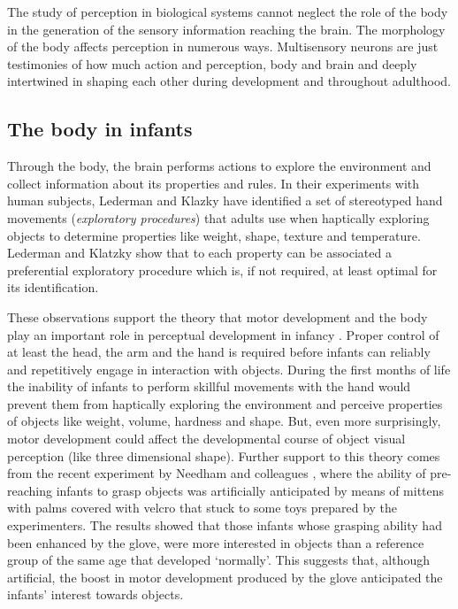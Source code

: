 The study of perception in biological systems cannot neglect the role
of the body in the generation of the sensory information reaching the
brain.  The morphology of the body affects perception in numerous
ways. Multisensory neurons are just testimonies of how much action 
and perception, body and brain and deeply intertwined in shaping each
other during development and throughout adulthood.


\subsection{The body in infants}

Through the body, the brain performs actions to explore the environment
and collect information about its properties and rules. In their
experiments with human subjects, Lederman and Klazky
\cite{lederman87hand} have identified a set of stereotyped hand
movements ({\it exploratory procedures}) that adults use when
haptically exploring objects to determine properties like weight,
shape, texture and temperature. Lederman and Klatzky show that to each
property can be associated a preferential exploratory procedure which
is, if not required, at least optimal for its identification.

These observations support the theory that motor development and the
body play an important role in perceptual development in infancy
\cite{bushnell93motor}. Proper control of at least the head, the arm
and the hand is required before infants can reliably and repetitively
engage in interaction with objects. During the first months of life
the inability of infants to perform skillful movements with the hand
would prevent them from haptically exploring the environment and
perceive properties of objects like weight, volume, hardness and
shape. But, even more surprisingly, motor development could affect the
developmental course of object visual perception (like three
dimensional shape).
%
Further support to this theory comes from the recent experiment by
Needham and colleagues \cite{Needham02apick-me-up}, where the ability
of pre-reaching infants to grasp objects was artificially anticipated
by means of mittens with palms covered with velcro that stuck to some
toys prepared by the experimenters. The results showed that those
infants whose grasping ability had been enhanced by the glove, were
more interested in objects than a reference group of the same age that
developed `normally'. This suggests that, although artificial, the
boost in motor development produced by the glove anticipated the
infants' interest towards objects.

